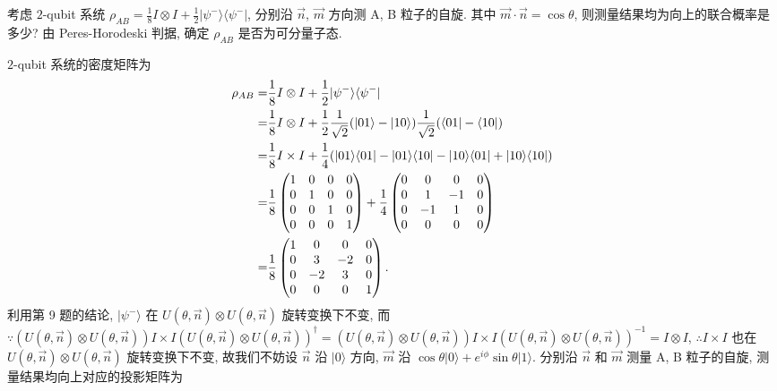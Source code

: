 \documentclass{assignment}
\begin{document}
\begin{probcontinued}{11}
    考虑 $2$-qubit 系统 $\rho_{AB}=\frac{1}{8}I\otimes I+\frac{1}{2}\lvert\psi^-\rangle\langle\psi^-\rvert$, 分别沿 $\vec{n}$, $\vec{m}$ 方向测 A, B 粒子的自旋. 其中 $\vec{m}\cdot\vec{n}=\cos\theta$, 则测量结果均为向上的联合概率是多少? 由 Peres-Horodeski 判据, 确定 $\rho_{AB}$ 是否为可分量子态.
\end{probcontinued}
\begin{sol}
    $2$-qubit 系统的密度矩阵为
    \begin{align}
        \notag\rho_{AB}=&\frac{1}{8}I\otimes I+\frac{1}{2}\lvert\psi^-\rangle\langle\psi^-\rvert\\
        \notag=&\frac{1}{8}I\otimes I+\frac{1}{2}\frac{1}{\sqrt{2}}(\lvert 01\rangle-\lvert 10\rangle)\frac{1}{\sqrt{2}}(\langle 01\rvert-\langle 10\rvert)\\
        \notag=&\frac{1}{8}I\times I+\frac{1}{4}(\lvert 01\rangle\langle 01\rvert-\lvert 01\rangle\langle 10\rvert-\lvert 10\rangle\langle 01\rvert+\lvert 10\rangle\langle 10\rvert)\\
        \notag=&\frac{1}{8}\begin{pmatrix}
            1&0&0&0\\
            0&1&0&0\\
            0&0&1&0\\
            0&0&0&1
        \end{pmatrix}+\frac{1}{4}\begin{pmatrix}
            0&0&0&0\\
            0&1&-1&0\\
            0&-1&1&0\\
            0&0&0&0
        \end{pmatrix}\\
        =&\frac{1}{8}\begin{pmatrix}
            1&0&0&0\\
            0&3&-2&0\\
            0&-2&3&0\\
            0&0&0&1
        \end{pmatrix}.
    \end{align}
    利用第 9 题的结论, $\lvert\psi^-\rangle$ 在 $U(\theta,\vec{n})\otimes U(\theta,\vec{n})$ 旋转变换下不变, 而 $\because(U(\theta,\vec{n})\otimes U(\theta,\vec{n}))I\times I(U(\theta,\vec{n})\otimes U(\theta,\vec{n}))^{\dagger}=(U(\theta,\vec{n})\otimes U(\theta,\vec{n}))I\times I(U(\theta,\vec{n})\otimes U(\theta,\vec{n}))^{-1}=I\otimes I$, $\therefore I\times I$ 也在 $U(\theta,\vec{n})\otimes U(\theta,\vec{n})$ 旋转变换下不变, 故我们不妨设 $\vec{n}$ 沿 $\lvert 0\rangle$ 方向, $\vec{m}$ 沿 $\cos\theta\lvert 0\rangle+e^{i\phi}\sin\theta\lvert 1\rangle$. 分别沿 $\vec{n}$ 和 $\vec{m}$ 测量 A, B 粒子的自旋, 测量结果均向上对应的投影矩阵为

\end{sol}
\end{document}
